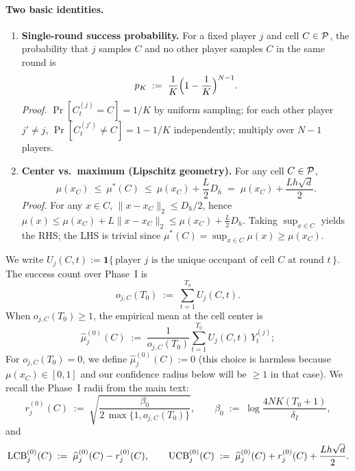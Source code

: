 \paragraph{Two basic identities.}
\begin{enumerate}
\item[(i)] \textbf{Single-round success probability.} For a fixed player $j$ and cell $C\in\mathcal{P}$, the probability that $j$ samples $C$ and no other player samples $C$ in the same round is
\begin{equation}
\label{eq:pK}
p_K \;:=\; \frac{1}{K}\Bigl(1-\frac{1}{K}\Bigr)^{N-1}.
\end{equation}
\emph{Proof.} $\Pr[C_t^{(j)}=C]=1/K$ by uniform sampling; for each other player $j'\neq j$, $\Pr[C_t^{(j')}\neq C]=1-1/K$ independently; multiply over $N-1$ players.

\item[(ii)] \textbf{Center vs.\ maximum (Lipschitz geometry).} For any cell $C\in\mathcal{P}$,
\begin{equation}
\label{eq:center-max-bracket}
\mu(x_C)\ \le\ \mu^\ast(C)\ \le\ \mu(x_C) + \frac{L}{2}D_h \;=\; \mu(x_C) + \frac{Lh\sqrt d}{2}.
\end{equation}
\emph{Proof.} For any $x\in C$, $\|x-x_C\|_2\le D_h/2$, hence $\mu(x)\le \mu(x_C)+L\|x-x_C\|_2\le \mu(x_C)+\tfrac L2 D_h$. Taking $\sup_{x\in C}$ yields the RHS; the LHS is trivial since $\mu^\ast(C)=\sup_{x\in C}\mu(x)\ge \mu(x_C)$.
\end{enumerate}

\medskip

We write $U_j(C,t):=\mathbf 1\{\,\text{player $j$ is the unique occupant of cell $C$ at round $t$}\,\}$. The success count over Phase~I is
\[
o_{j,C}(T_0)\;:=\;\sum_{t=1}^{T_0} U_j(C,t).
\]
When $o_{j,C}(T_0)\ge 1$, the empirical mean at the cell center is
\[
\widehat\mu^{(0)}_j(C)\;:=\;\frac{1}{o_{j,C}(T_0)}\sum_{t=1}^{T_0} U_j(C,t)\,Y_t^{(j)};
\]
For $o_{j,C}(T_0)=0$, we define $\widehat\mu^{(0)}_j(C):=0$ (this choice is harmless because $\mu(x_C)\in[0,1]$ and our confidence radius below will be $\ge 1$ in that case). We recall the Phase~I radii from the main text:
\begin{equation}
\label{eq:phase1-radius}
r^{(0)}_{j}(C) \;:=\; \sqrt{\frac{\beta_0}{2\,\max\{1,o_{j,C}(T_0)\}}}, 
\qquad
\beta_0 \;:=\; \log\!\frac{4 N K (T_0+1)}{\delta_{I}},
\end{equation}
and
\begin{equation}
\label{eq:phase1-brackets-def}
\operatorname{LCB}^{(0)}_j(C) \;:=\; \widehat{\mu}_{j}^{(0)}(C) - r^{(0)}_{j}(C),
\qquad
\operatorname{UCB}^{(0)}_j(C) \;:=\; \widehat{\mu}_{j}^{(0)}(C) + r^{(0)}_{j}(C) + \frac{L h\sqrt{d}}{2}.
\end{equation}


